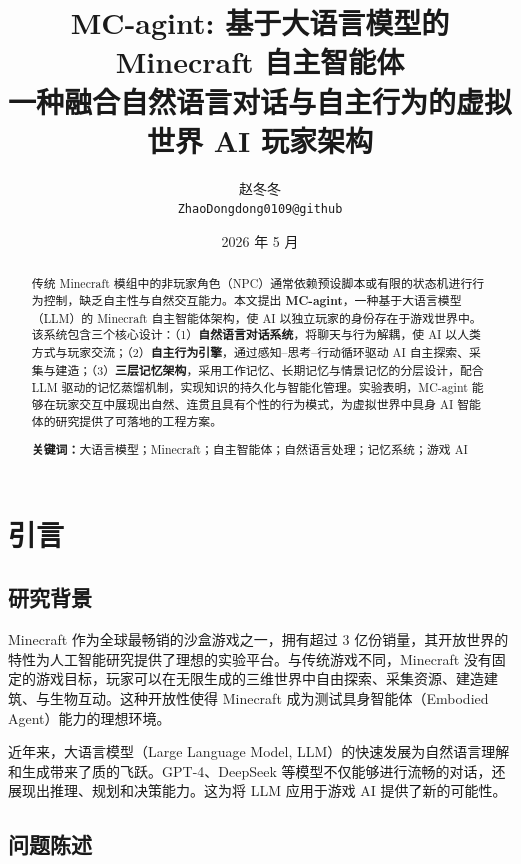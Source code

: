 \documentclass[12pt,a4paper]{article}
\title{
    \textbf{MC-agint: 基于大语言模型的 Minecraft 自主智能体}\\[0.5em]
    \large 一种融合自然语言对话与自主行为的虚拟世界 AI 玩家架构
}
\author{
    赵冬冬\\
    \texttt{ZhaoDongdong0109@github}
}
\date{2026 年 5 月}
\begin{document}
\maketitle
\thispagestyle{fancy}

\begin{abstract}
\noindent
传统 Minecraft 模组中的非玩家角色（NPC）通常依赖预设脚本或有限的状态机进行行为控制，缺乏自主性与自然交互能力。本文提出 \textbf{MC-agint}，一种基于大语言模型（LLM）的 Minecraft 自主智能体架构，使 AI 以独立玩家的身份存在于游戏世界中。该系统包含三个核心设计：（1）\textbf{自然语言对话系统}，将聊天与行为解耦，使 AI 以人类方式与玩家交流；（2）\textbf{自主行为引擎}，通过感知--思考--行动循环驱动 AI 自主探索、采集与建造；（3）\textbf{三层记忆架构}，采用工作记忆、长期记忆与情景记忆的分层设计，配合 LLM 驱动的记忆蒸馏机制，实现知识的持久化与智能化管理。实验表明，MC-agint 能够在玩家交互中展现出自然、连贯且具有个性的行为模式，为虚拟世界中具身 AI 智能体的研究提供了可落地的工程方案。

\vspace{0.5em}
\noindent\textbf{关键词：}大语言模型；Minecraft；自主智能体；自然语言处理；记忆系统；游戏 AI
\end{abstract}

\newpage
\tableofcontents
\newpage

\section{引言}

\subsection{研究背景}

Minecraft 作为全球最畅销的沙盒游戏之一，拥有超过 3 亿份销量，其开放世界的特性为人工智能研究提供了理想的实验平台\cite{minecraft2023}。与传统游戏不同，Minecraft 没有固定的游戏目标，玩家可以在无限生成的三维世界中自由探索、采集资源、建造建筑、与生物互动。这种开放性使得 Minecraft 成为测试具身智能体（Embodied Agent）能力的理想环境。

近年来，大语言模型（Large Language Model, LLM）的快速发展为自然语言理解和生成带来了质的飞跃\cite{brown2020language, ouyang2022training}。GPT-4、DeepSeek 等模型不仅能够进行流畅的对话，还展现出推理、规划和决策能力。这为将 LLM 应用于游戏 AI 提供了新的可能性。

\subsection{问题陈述}
\end{document}
